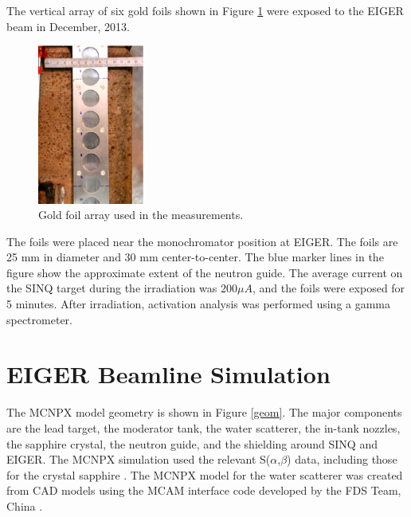 \documentclass[a4paper,
              ]{jacow}
\begin{document}
The vertical array of six gold foils shown in Figure \ref{foils} were exposed to the EIGER beam in December, 2013.   

\begin{figure}[!htb]
   \centering
   \includegraphics*[width=35mm,angle=90]{THPF102f1.eps}
   \caption{Gold foil array used in the measurements.}
   \label{foils}
\end{figure}

The foils were placed near the monochromator position at EIGER.  The foils are 25 mm in diameter and 30 mm center-to-center.  The blue marker lines in the figure show the approximate extent of the neutron guide.  The average current on the SINQ target during the irradiation was $200 \mu A$, and the foils were exposed for 5 minutes.  After irradiation, activation analysis was performed using a gamma spectrometer.


\section{EIGER Beamline Simulation}

The MCNPX model geometry is shown in Figure \ref{geom}.  The major components are the lead target, the moderator tank, the water scatterer, the in-tank nozzles, the sapphire crystal, the neutron guide, and the shielding around SINQ and EIGER.  The MCNPX simulation used the relevant S($\alpha$,$\beta$) data, including those for the crystal sapphire \cite{sapp}.  The MCNPX model for the water scatterer was created from CAD models using the MCAM interface code developed by the FDS Team, China \cite{mcam}.
\end{document}
